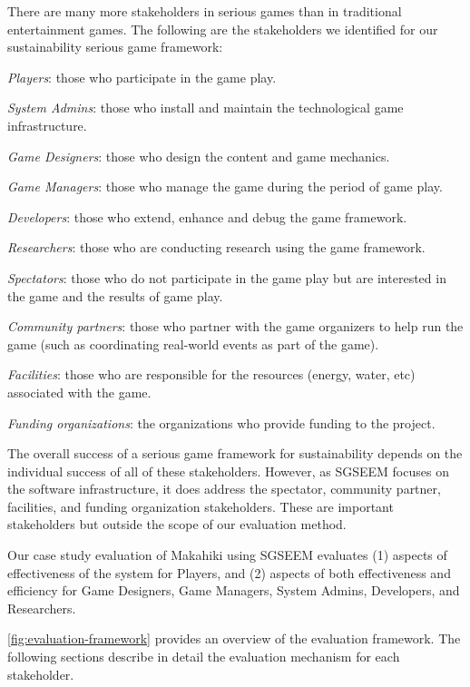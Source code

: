 \documentclass{sigchi}
\begin{document}
There are many more stakeholders in serious games than in traditional entertainment
games. The following are the stakeholders we identified for our sustainability serious game framework:

\begin{compactitem}
\item \emph{Players}: those who participate in the game play.
\item \emph{System Admins}: those who install and maintain the technological game infrastructure.
\item \emph{Game Designers}: those who design the content and game mechanics.
 \item \emph{Game Managers}: those who manage the game during the period of game play.
\item \emph{Developers}: those who extend, enhance and debug the game framework.
\item \emph{Researchers}: those who are conducting research using the game framework.
\item \emph{Spectators}: those who do not participate in the game
  play but are interested in the game and the results of game play.
\item \emph{Community partners}: those who partner
  with the game organizers to help run the game (such as coordinating real-world events as part of the game).
\item \emph{Facilities}: those who are responsible for the resources (energy, water, etc)
  associated with the game.
\item \emph{Funding organizations}: the organizations who provide
  funding to the project.
\end{compactitem}

The overall success of a serious game framework for sustainability depends on the
individual success of all of these stakeholders. However, as SGSEEM focuses on the software
infrastructure, it does address the spectator, community partner, facilities, and funding
organization stakeholders.  These are important stakeholders but outside the scope of our
evaluation method.

Our case study evaluation of Makahiki using SGSEEM evaluates (1) aspects of 
effectiveness of the system for Players, and (2) aspects of both effectiveness and
efficiency for Game Designers, Game Managers, System Admins, Developers, and Researchers. 

\autoref{fig:evaluation-framework} provides an overview of the evaluation framework. The
following sections describe in detail the evaluation mechanism for each stakeholder.
\end{document}
